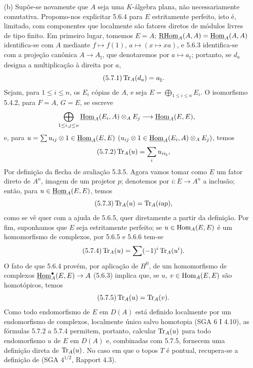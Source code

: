 (b) Supõe-se novamente que $A$ seja uma $K$-álgebra plana, não necessariamente comutativa. Propomo-nos explicitar 5.6.4 para $E$ estritamente perfeito, isto é, limitado, com componentes que localmente são fatores diretos de módulos livres de tipo finito. Em primeiro lugar, tomemos $E=A$; $\underline{\mathrm{RHom}}_A(A,A)=\underline{\operatorname{Hom}}_A(A,A)$ identifica-se com $A$ mediante $f\mapsto f(1)$, $a\mapsto(x\mapsto xa)$, e 5.6.3 identifica-se com a projeção canônica $A\to A_\natural$, que denotaremos por $a\mapsto a_\natural$; portanto, se $d_a$ designa a multiplicação à direita por $a$,
\begin{equation}\tag{5.7.1}
\operatorname{Tr}_A(d_a)=a_\natural.
\end{equation}
Sejam, para $1\le i\le n$, os $E_i$ cópias de $A$, e seja $E=\bigoplus_{1\le i\le n}E_i$. O isomorfismo 5.4.2, para $F=A$, $G=E$, se escreve
\[
\bigoplus_{1\le i,j\le n}\underline{\operatorname{Hom}}_A(E_i,A)\otimes_AE_j\longrightarrow\underline{\operatorname{Hom}}_A(E,E),
\]
e, para $u=\sum u_{ij}\otimes 1\in\underline{\operatorname{Hom}}_A(E,E)$ $(u_{ij}\otimes 1\in\underline{\operatorname{Hom}}_A(E_i,A)\otimes_A E_j)$, temos
\begin{equation}\tag{5.7.2}
\operatorname{Tr}_A(u)=\sum_i u_{ii_\natural},
\end{equation}
Por definição da flecha de avaliação 5.3.5. Agora vamos tomar como $E$ um fator direto de $A^n$, imagem de um projetor $p$; denotemos por $i:E\to A^n$ a inclusão; então, para $u\in\underline{\operatorname{Hom}}_A(E,E)$, temos
\begin{equation}\tag{5.7.3}
\operatorname{Tr}_A(u)=\operatorname{Tr}_A(iup),
\end{equation}
como se vê quer com a ajuda de 5.6.5, quer diretamente a partir da definição. Por fim, suponhamos que $E$ seja estritamente perfeito; se $u\in\operatorname{Hom}_A(E,E)$ é um homomorfismo de complexos, por 5.6.5 e 5.6.6 tem-se
\begin{equation}\tag{5.7.4}
\operatorname{Tr}_A(u)=\sum(-1)^i\operatorname{Tr}_A(u^i).
\end{equation}
O fato de que 5.6.4 provém, por aplicação de $H^0$, de um homomorfismo de complexos $\underline{\operatorname{Hom}}_A^\bullet(E,E)\to A$ (5.6.3) implica que, se $u$, $v\in\operatorname{Hom}_A(E,E)$ são homotópicos, temos
\begin{equation}\tag{5.7.5}
\operatorname{Tr}_A(u)=\operatorname{Tr}_A(v).
\end{equation}
Como todo endomorfismo de $E$ em $D(A)$ está definido localmente por um endomorfismo de complexos, localmente único salvo homotopia (SGA 6 I 4.10), as fórmulas 5.7.2 a 5.7.4 permitem, portanto, calcular $\operatorname{Tr}_A(u)$ para todo endomorfismo $u$ de $E$ em $D(A)$ e, combinadas com 5.7.5, fornecem uma definição direta de $\operatorname{Tr}_A(u)$. No caso em que o topos $T$ é pontual, recupera-se a definição de (SGA $4^{1/2}$, Rapport 4.3).
